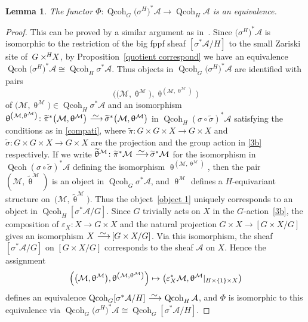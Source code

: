 \documentclass[pdftex]{sigma}%
\newtheorem{lem}[dfn]{Lemma}
\numberwithin{equation}{section}
\newcommand{\Qcoh}{\operatorname{Qcoh}}
\newcommand{\cA}{\mathcal{A}}
\newcommand{\cM}{\mathcal{M}}
\newcommand{\simto}{\,\,\,\,\raisebox{4pt}{$\sim$}{\kern -1.1em \longrightarrow}\,}
\newcommand{\timesH}{\times^{\hspace{-0.2mm}H\hspace{0.2mm}}\!\!}
\begin{document}
\begin{lem}%
The functor $\Phi\colon \Qcoh _G\big(\sigma^H\big)^*\cA\to \Qcoh_H\cA$ is an equivalence.
\end{lem}
\begin{proof} This can be proved by a similar argument as in~\cite[Lemma~1.3]{tho}.
 Since $\big(\sigma^H\big)^*\cA$ is isomorphic to the restriction of the big fppf sheaf $[\sigma^*\cA/H]$ to the small Zariski site of~\mbox{$G\timesH X$}, by Proposition~\ref{quotient correspond} we have an equivalence $\Qcoh\big(\sigma^H\big)^*\cA\cong \Qcoh_H\sigma^*\cA$. Thus objects in $\Qcoh _G\big(\sigma^H\big)^*\cA$ are identified with pairs
\begin{equation}\label{object 1}
\Big(\big(\cM,\uptheta^{\cM}\big), \uptheta^{\left(\cM,\uptheta^{\cM}\right)}\Big)
\end{equation}
{\sloppy of $\big(\cM,\uptheta^{\cM}\big)\in \Qcoh_H\sigma^*\cA$ and an isomorphism $\uptheta^{\left(\cM,\uptheta^{\cM}\right)}\colon \widetilde{\pi}^*\big(\cM,\uptheta^{\cM}\big)\simto \widetilde{\sigma}^*\big(\cM,\uptheta^{\cM}\big)$ in $\Qcoh_H(\sigma\circ\widetilde{\sigma})^*\cA$ satisfying the conditions as in \eqref{compati}, where $\widetilde{\pi}\colon G\times G\times X\to G\times X$ and $\widetilde{\sigma}\colon G\times G\times X\to G\times X$ are the projection and the group action in \eqref{3b} respectively. If we write $\widetilde{\uptheta}^{\cM}\colon \widetilde{\pi}^*\cM\simto\widetilde{\sigma}^*\cM$ for the isomorphism in $\Qcoh(\sigma\circ\widetilde{\sigma})^*\cA$ defining the isomorphism $\uptheta^{\left(\cM,\uptheta^{\cM}\right)}$, then the pair $(\cM,\widetilde{\uptheta}^{\cM})$ is an object in $\Qcoh_G\sigma^*\cA$, and $\uptheta^{\cM}$ defines a $H$-equivariant structure on~$\big(\cM,\widetilde{\uptheta}^{\cM}\big)$. Thus the object~\eqref{object 1} uniquely corresponds to an object in $\Qcoh_H[\sigma^*\cA/G]$. Since $G$ trivially acts on $X$ in the $G$-action~\eqref{3b}, the composition of $\varepsilon_X\colon X\to G\times X$ and the natural projection $G\times X\to [G\times X/G]$ gives an isomorphism $ X\simto[G\times X/G]$. Via this isomorphism, the sheaf $[\sigma^*\cA/G]$ on $[G\times X/G]$ corresponds to the sheaf $\cA$ on $X$. Hence the assignment
 \begin{gather*}
 \Bigl(\big(\cM,\uptheta^{\cM}\big), \uptheta^{\left(\cM,\uptheta^{\cM}\right)}\Bigr)\mapsto \big(\varepsilon_X^*\cM,\uptheta^{\cM}|_{H\times \{1\}\times X}\big)
 \end{gather*}}\noindent
 defines an equivalence $\Qcoh_G[\sigma^*\cA/H]\simto \Qcoh_H\cA$, and $\Phi$ is isomorphic to this equivalence via $\Qcoh _G\big(\sigma^H\big)^*\cA\cong \Qcoh_G[\sigma^*\cA/H]$.
 \end{proof}
\end{document}
